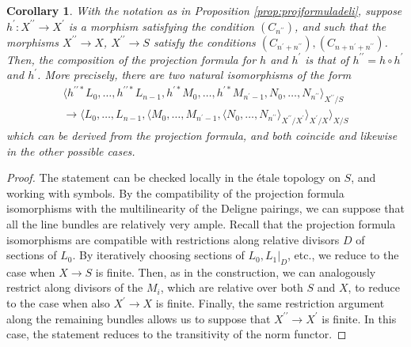 \documentclass[JEP,XML,SOM,Unicode,published]{cedram}
\theoremstyle{plain}
\newtheorem{corollary}[theorem]{Corollary}
\theoremstyle{definition}
\newcommand{\bis}{\prime\prime}
\begin{document}
\begin{corollary} \label{cor:compprojformula}
With the notation as in Proposition \ref{prop:projformuladeli}, suppose $h^{\prime}: X^{\bis} \to X^{\prime}$ is a morphism satisfying the condition $(C_{n^{\bis}})$, and such that the morphisms $X^{\bis} \to X$, $X^{\bis} \to S$ satisfy the conditions $(C_{n^{\prime} + n^{\bis}}), (C_{n+n^{\prime} + n^{\bis}})$. Then, the composition of the projection formula for $h$ and $h^{\prime}$ is that of $ h^{\bis}=h\circ h^{\prime}$ and $h^{\prime}$. More precisely, there are two natural isomorphisms of the form
\begin{multline*}
\langle h^{\bis \ast } L_0, \ldots, h^{\bis \ast}L_{n-1}, h^{\prime\ast} M_0, \ldots, h^{\prime\ast} M_{n^{\prime}-1}, N_{0}, \ldots, N_{n^{\bis}} \rangle_{X^{\bis}/S}\\
\to
\langle L_{0},\ldots, L_{n-1}, \langle M_{0},\ldots, M_{n^{\prime}-1},\langle N_{0},\ldots,N_{n^{\bis}}\rangle_{X^{\bis}/X^{\prime}}\rangle_{X^{\prime}/X}\rangle_{X/S}
\end{multline*}
which can be derived from the projection formula, and both coincide and likewise in the other possible cases.
\end{corollary}
\begin{proof}
The statement can be checked locally in the étale topology on $S$, and working with symbols. By the compatibility of the projection formula isomorphisms with the multilinearity of the Deligne pairings, we can suppose that all the line bundles are relatively very ample. Recall that the projection formula isomorphisms are compatible with restrictions along relative divisors $D$ of sections of $L_0$. By iteratively choosing sections of $L_0, L_1|_D $, etc., we reduce to the case when $X \to S$ is finite. Then, as in the construction, we can analogously restrict along divisors of the $M_i$, which are relative over both $S$ and $X$, to reduce to the case when also $X^{\prime} \to X$ is finite. Finally, the same restriction argument along the remaining bundles allows us to suppose that $X^{\bis} \to X^{\prime}$ is finite. In this case, the statement reduces to the transitivity of the norm functor.
\end{proof}
\end{document}
